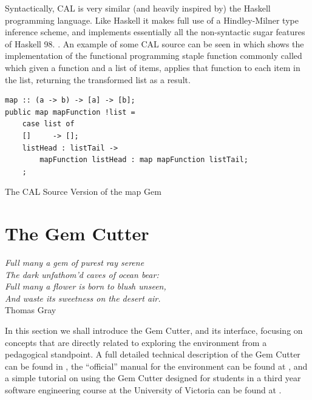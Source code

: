 Syntactically, CAL is very similar (and heavily inspired by) the Haskell programming language.  Like Haskell it makes full use of a Hindley-Milner type inference scheme, and implements essentially all the non-syntactic sugar features of Haskell 98. \cite{evans07, Ilic07}.  An example of some CAL source can be seen in  which shows the implementation of the functional programming staple function commonly called  which given a function and a list of items, applies that function to each item in the list, returning the transformed list as a result.  


\begin{program}
\begin{verbatim}
map :: (a -> b) -> [a] -> [b]; 
public map mapFunction !list = 
    case list of 
    []     -> []; 
    listHead : listTail ->  
        mapFunction listHead : map mapFunction listTail; 
    ; 
\end{verbatim}
\caption{The CAL Source Version of the map Gem}
\label{prog:calmap}
\end{program}

\section{The Gem Cutter}

\begin{flushright}
\textit{Full many a gem of purest ray serene\\
The dark unfathom'd caves of ocean bear:\\
Full many a flower is born to blush unseen,\\
And waste its sweetness on the desert air.}
\\
Thomas Gray \cite{Gray51} \\
\end{flushright}

In this section we shall introduce the Gem Cutter, and its interface, focusing on concepts that are directly related to exploring the environment from a pedagogical standpoint.  A full detailed technical description of the Gem Cutter can be found in \cite{evans07}, the ``official'' manual for the environment can be found at \cite{evans06}, and a simple tutorial on using the Gem Cutter designed for students in a third year software engineering course at the University of Victoria can be found at \cite{parkin08}.

